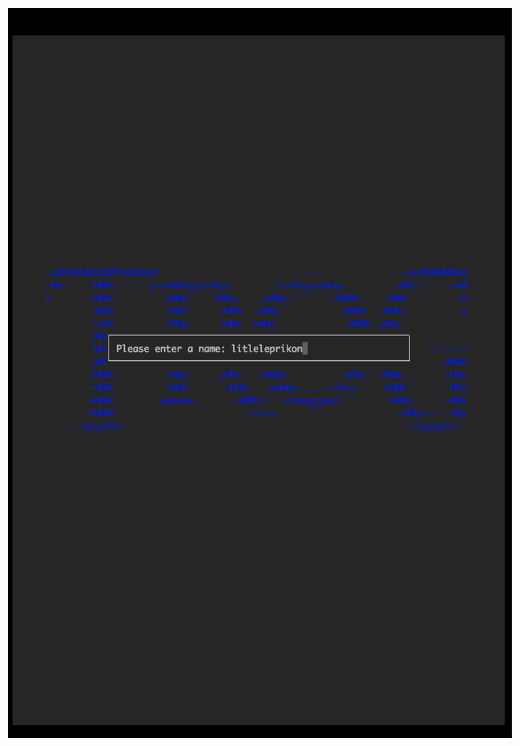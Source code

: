 \documentclass[a4paper,11pt]{article}
\begin{document}
\includegraphics[width=17cm]{2.png}
\end{document}
